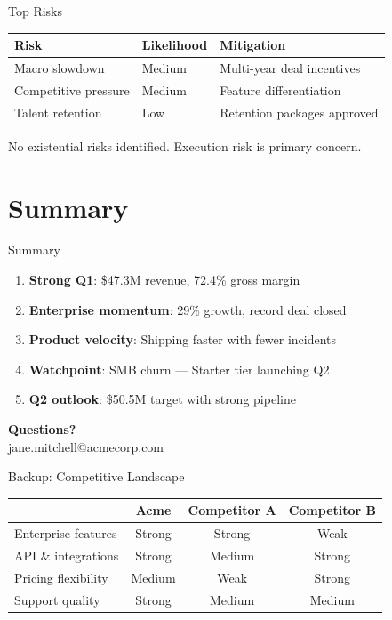 \documentclass[aspectratio=169,11pt]{beamer}
\begin{document}
\begin{frame}{Top Risks}
    \begin{tabular}{l l l}
        \toprule
        \textbf{Risk} & \textbf{Likelihood} & \textbf{Mitigation} \\
        \midrule
        Macro slowdown & Medium & Multi-year deal incentives \\
        Competitive pressure & Medium & Feature differentiation \\
        Talent retention & Low & Retention packages approved \\
        \bottomrule
    \end{tabular}

    \vspace{16pt}
    \alert{No existential risks identified. Execution risk is primary concern.}
\end{frame}

\section{Summary}

\begin{frame}{Summary}
    \begin{enumerate}
        \item \textbf{Strong Q1}: \$47.3M revenue, 72.4\% gross margin
        \item \textbf{Enterprise momentum}: 29\% growth, record deal closed
        \item \textbf{Product velocity}: Shipping faster with fewer incidents
        \item \textbf{Watchpoint}: SMB churn --- Starter tier launching Q2
        \item \textbf{Q2 outlook}: \$50.5M target with strong pipeline
    \end{enumerate}

    \vspace{24pt}
    \centering
    {\Large \textbf{Questions?}}\\[8pt]
    {\small jane.mitchell@acmecorp.com}
\end{frame}

\appendix

\begin{frame}{Backup: Competitive Landscape}
    \centering
    \begin{tabular}{l c c c}
        \toprule
        & \textbf{Acme} & \textbf{Competitor A} & \textbf{Competitor B} \\
        \midrule
        Enterprise features & Strong & Strong & Weak \\
        API \& integrations & Strong & Medium & Strong \\
        Pricing flexibility & Medium & Weak & Strong \\
        Support quality & Strong & Medium & Medium \\
        \bottomrule
    \end{tabular}
\end{frame}
\end{document}
